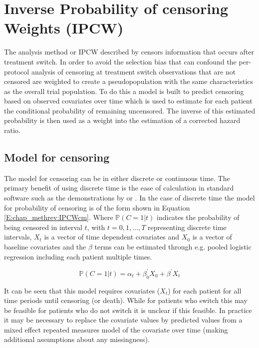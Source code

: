 \section{Inverse Probability of censoring Weights (IPCW)}

The analysis method or IPCW described by \cite{Robins2000} censors information that occurs after treatment switch. In order to avoid the selection bias that can confound the per-protocol analysis of censoring at treatment switch observations that are not censored are weighted to create a pseudopopulation with the same characteristics as the overall trial population. To do this a model is built to predict censoring based on observed covariates over time which is used to estimate for each patient the conditional probability of remaining uncensored. The inverse of this estimated probability is then used as a weight into the estimation of a corrected hazard ratio. 

\subsection{Model for censoring}

The model for censoring can be in either discrete or continuous time. The primary benefit of using discrete time is the ease of calculation in standard software such as the demonstrations by \cite{Hernan2000} or \cite{Fewell2004}. In the case of discrete time the model for probability of censoring is of the form shown in Equation \ref{E:chap_methrev:IPCWcm}. Where $\mathbb{P}(C=1|t)$ indicates the probability of being censored in interval $t$, with $t=0,1, \ldots, T$ representing discrete time intervals, $X_t$ is a vector of time dependent covariates and $X_0$ is a vector of baseline covariates and the $\beta$ terms can be estimated through e.g. pooled logistic regression including each patient multiple times.

\begin{equation}
\label{E:chap_methrev:IPCWcm}
\mathbb{P}(C=1|t) = \alpha_t + \beta_0^\prime  X_0 + \beta^\prime X_t 
\end{equation}

It can be seen that this model requires covariates ($X_t$) for each patient for all time periods until censoring (or death). While for patients who switch this may be feasible for patients who do not switch it is unclear if this feasible. In practice it may be necessary to replace the covariate values by predicted values from a mixed effect repeated measures model of the covariate over time (making additional assumptions about any missingness).

